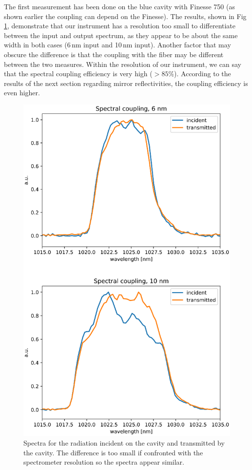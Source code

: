The first measurement has been done on the blue cavity with Finesse 750 (as shown earlier the coupling can depend on the Finesse).
The results, shown in Fig \ref{fig:6nm}, demonstrate that our instrument has a resolution too small to differentiate between the input and output spectrum, as they appear to be about the same width in both cases (6\,nm input and 10\,nm input).
Another factor that may obscure the difference is that the coupling with the fiber may be different between the two measures. Within the resolution of our instrument, we can say that the spectral coupling efficiency is very high ($>85\%$). According to the results of the next section regarding mirror reflectivities, the coupling efficiency is even higher.

\begin{figure}
	\centering
	\includegraphics[width=0.9\linewidth]{images/6nm.eps}
	\caption{Spectra for the radiation incident on the cavity and transmitted by the cavity. The difference is too small if confronted with the spectrometer resolution so the spectra appear similar.}
	\label{fig:6nm}
\end{figure}

